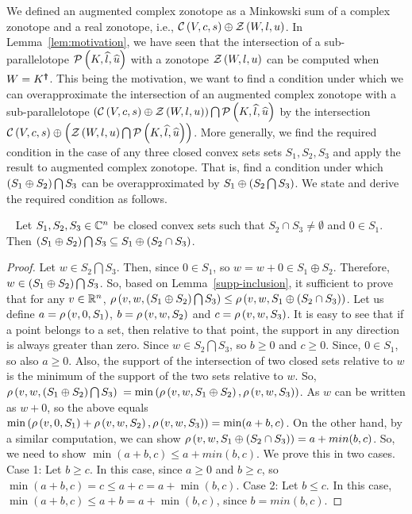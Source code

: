 We defined an augmented complex zonotope as a Minkowski sum of a
complex zonotope and a real zonotope, i.e.,
$\cz{V}{c}{s}\oplus\zon{W}{l}{u}$.  In Lemma~\ref{lem:motivation}, we
have seen that the intersection of a sub-parallelotope
$\sptope{K}{\wh{l}}{\wh{u}}$ with a zonotope $\zon{W}{l}{u}$ can be
computed when $W=\pinv{K}$.  This being the motivation, we want to
find a condition under which we can overapproximate the intersection
of an augmented complex zonotope with a sub-parallelotope
$\lt(\cz{V}{c}{s}\oplus\zon{W}{l}{u}\rt)\bigcap\sptope{K}{\wh{l}}{\wh{u}}$
by the intersection
$\cz{V}{c}{s}\oplus\lt(\zon{W}{l}{u}\bigcap\sptope{K}{\wh{l}}{\wh{u}}\rt)$.
More generally, we find the required condition in the case of any
three closed convex sets sets $S_1,S_2,S_3$ and apply the result to
augmented complex zonotope.  That is, find a condition under which
$\lt(S_1\oplus S_2\rt)\bigcap S_3$ can be overapproximated by
$S_1\oplus\lt(S_2\bigcap S_3\rt)$.  We state and derive the required
condition as follows.
%
\begin{lemma}~\label{gen-int}
Let $S_1,S_2,S_3\in\complexset^n$ be closed convex sets such that
$S_2\cap S_3\neq \emptyset$ and $0\in S_1$.  Then $\lt(S_1\oplus S_2\rt)\bigcap
S_3\subseteq S_1\oplus\lt(S_2\cap S_3\rt)$.
\end{lemma}
\begin{proof}
 Let $w\in S_2\bigcap S_3$.  Then, since $0\in S_1$, so $w=w+0\in
 S_1\oplus S_2$.  Therefore, $w\in \lt(S_1\oplus S_2\rt)\bigcap S_3$.
 So, based on Lemma~\ref{supp-inclusion}, it sufficient to prove that
 for any $v\in\realset^n$, $\support{w}{v}{\lt(S_1\oplus
   S_2\rt)\bigcap S_3}\leq \support{w}{v}{S_1\oplus\lt(S_2\cap
   S_3\rt)}$.  Let us define $a = \support{0}{v}{S_1}$,
 $b=\support{w}{v}{S_2}$ and $c = \support{w}{v}{S_3}$.  It is easy to
 see that if a point belongs to a set, then relative to that point,
 the support in any direction is always greater than zero.  Since
 $w\in S_2\bigcap S_3$, so $b\geq 0$ and $c\geq 0$.  Since, $0\in
 S_1$, so also $a\geq 0$.  Also, the support of the intersection of
 two closed sets relative to $w$ is the minimum of the support of the
 two sets relative to $w$.  So, $\support{w}{v}{\lt(S_1\oplus
   S_2\rt)\bigcap S_3}$ $= \min\lt(\support{w}{v}{S_1\oplus
   S_2},\support{w}{v}{S_3}\rt)$.  As $w$ can be written as $w+0$, so
 the above equals
 $\min\lt(\support{0}{v}{S_1}+\support{w}{v}{S_2},\support{w}{v}{S_3}\rt)
 = \min(a+b,c)$.  On the other hand, by a similar computation, we can
 show $\support{w}{v}{S_1\oplus\lt(S_2\cap S_3\rt)} = a+min(b,c)$.
 So, we need to show $\min(a+b,c)\leq a+min(b,c)$.  We prove this in
 two cases. Case 1: Let $b\geq c$.  In this case, since $a\geq 0$ and
 $b\geq c$, so $\min(a+b,c) = c \leq a+c = a+\min(b,c)$.  Case 2: Let
 $b\leq c$.  In this case, $\min(a+b,c)\leq a+b = a+\min(b,c)$, since
 $b=min(b,c)$.
\end{proof}

